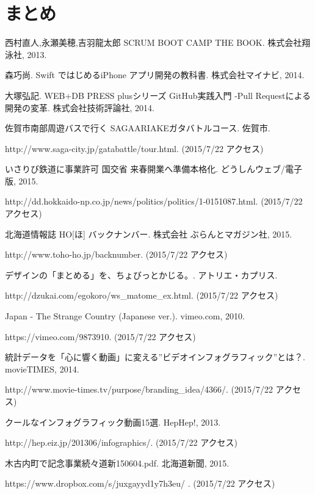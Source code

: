 \documentclass[openany,11pt,papersize]{jsbook}
\begin{document}
\chapter{まとめ}

\begin{thebibliography}{9}
\newblock 西村直人,永瀬美穂,吉羽龍太郎
\newblock SCRUM BOOT CAMP THE BOOK.
\newblock 株式会社翔泳社, 2013.

\newblock 森巧尚.
\newblock Swift ではじめるiPhone アプリ開発の教科書.
\newblock 株式会社マイナビ, 2014.

\newblock 大塚弘記.
\newblock WEB+DB PRESS plusシリーズ GitHub実践入門 -Pull Requestによる開発の変革.
\newblock 株式会社技術評論社, 2014.

佐賀市南部周遊バスで行く SAGAARIAKEガタバトルコース. 佐賀市. \par
http://www.saga-city.jp/gatabattle/tour.html. (2015/7/22 アクセス)

いさりび鉄道に事業許可 国交省 来春開業へ準備本格化. どうしんウェブ/電子版, 2015.\par
http://dd.hokkaido-np.co.jp/news/politics/politics/1-0151087.html. (2015/7/22 アクセス)

北海道情報誌 HO[ほ] バックナンバー. 株式会社 ぶらんとマガジン社, 2015.\par 
http://www.toho-ho.jp/backnumber. (2015/7/22 アクセス)

デザインの「まとめる」を、ちょびっとかじる。.  	アトリエ・カプリス. \par
http://dzukai.com/egokoro/ws\_matome\_ex.html. (2015/7/22 アクセス)

Japan - The Strange Country (Japanese ver.). vimeo.com, 2010.\par
https://vimeo.com/9873910. (2015/7/22 アクセス)

統計データを「心に響く動画」に変える”ビデオインフォグラフィック”とは？. movieTIMES, 2014.\par
http://www.movie-times.tv/purpose/branding\_idea/4366/. (2015/7/22 アクセス)

クールなインフォグラフィック動画15選. HepHep!, 2013.\par
http://hep.eiz.jp/201306/infographics/. (2015/7/22 アクセス)

木古内町で記念事業続々道新150604.pdf. 北海道新聞, 2015.\par
https://www.dropbox.com/s/juxgayyd1y7h3eu/%
. 
(2015/7/22 アクセス)


\end{thebibliography}
\end{document}
